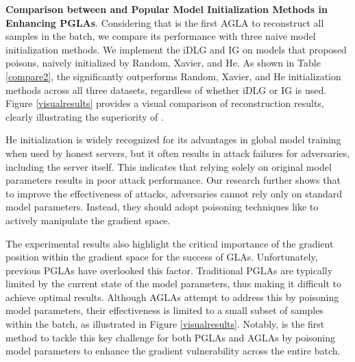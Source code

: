 \textbf{Comparison between \name and Popular Model Initialization Methods in Enhancing PGLAs}. Considering that \name is the first AGLA to reconstruct all samples in the batch, we compare its performance with three naive model initialization methods. We implement the iDLG \cite{zhao2020idlg} and IG \cite{geiping2020inverting} on models that proposed \name poisons, naively initialized by Random, Xavier, and He. As shown in Table \ref{compare2}, the \name significantly outperforms Random, Xavier, and He initialization methods across all three datasets, regardless of whether iDLG or IG is used. Figure \ref{visualresults} provides a visual comparison of reconstruction results, clearly illustrating the superiority of \name.

He initialization is widely recognized for its advantages in global model training when used by honest servers, but it often results in attack failures for adversaries, including the server itself. This indicates that relying solely on original model parameters results in poor attack performance. Our research further shows that to improve the effectiveness of attacks, adversaries cannot rely only on standard model parameters. Instead, they should adopt poisoning techniques like \name to actively manipulate the gradient space.

The experimental results also highlight the critical importance of the gradient position within the gradient space for the success of GLAs. Unfortunately, previous PGLAs have overlooked this factor. Traditional PGLAs are typically limited by the current state of the model parameters, thus making it difficult to achieve optimal results. Although AGLAs attempt to address this by poisoning model parameters, their effectiveness is limited to a small subset of samples within the batch, as illustrated in Figure \ref{visualresults}. Notably, \name is the first method to tackle this key challenge for both PGLAs and AGLAs by poisoning model parameters to enhance the gradient vulnerability across the entire batch.

